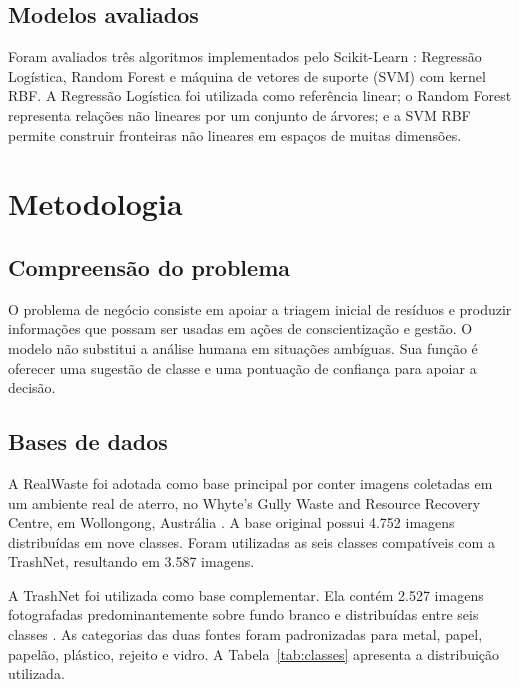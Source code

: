 \documentclass[11pt,a4paper]{article}
\begin{document}
\subsection{Modelos avaliados}

Foram avaliados três algoritmos implementados pelo Scikit-Learn \cite{pedregosa2011scikit}: Regressão Logística, Random Forest e máquina de vetores de suporte (SVM) com kernel RBF. A Regressão Logística foi utilizada como referência linear; o Random Forest representa relações não lineares por um conjunto de árvores; e a SVM RBF permite construir fronteiras não lineares em espaços de muitas dimensões.

\section{Metodologia}

\subsection{Compreensão do problema}

O problema de negócio consiste em apoiar a triagem inicial de resíduos e produzir informações que possam ser usadas em ações de conscientização e gestão. O modelo não substitui a análise humana em situações ambíguas. Sua função é oferecer uma sugestão de classe e uma pontuação de confiança para apoiar a decisão.

\subsection{Bases de dados}

A RealWaste foi adotada como base principal por conter imagens coletadas em um ambiente real de aterro, no Whyte's Gully Waste and Resource Recovery Centre, em Wollongong, Austrália \cite{single2023realwaste}. A base original possui 4.752 imagens distribuídas em nove classes. Foram utilizadas as seis classes compatíveis com a TrashNet, resultando em 3.587 imagens.

A TrashNet foi utilizada como base complementar. Ela contém 2.527 imagens fotografadas predominantemente sobre fundo branco e distribuídas entre seis classes \cite{thung2016trashnet}. As categorias das duas fontes foram padronizadas para metal, papel, papelão, plástico, rejeito e vidro. A Tabela~\ref{tab:classes} apresenta a distribuição utilizada.
\end{document}
